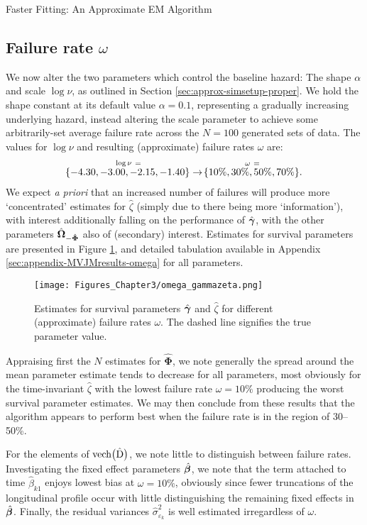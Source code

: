 \begin{chapter}{\label{cha:approx}Faster Fitting: An Approximate EM Algorithm}
  \subsection{Failure rate \texorpdfstring{$\omega$}{omega}}\label{sec:approx-sims-omega}
  We now alter the two parameters which control the baseline hazard: The shape $\alpha$ and scale $\log\nu$, as outlined in Section \ref{sec:approx-simsetup-proper}. We hold the shape constant at its default value $\alpha=0.1$, representing a gradually increasing underlying hazard, instead altering the scale parameter to achieve some arbitrarily-set average failure rate across the $N=100$ generated sets of data. The values for $\log\nu$ and resulting (approximate) failure rates $\omega$ are:
  \begin{align*}
      \overset{\log\nu\ =}{\!\left\{-4.30, -3.00, -2.15, -1.40\right\}}\rightarrow\overset{\omega\ =}{\!\left\{10\%,30\%,50\%,70\%\right\}}.
  \end{align*}
  We expect \textit{a priori} that an increased number of failures will produce more `concentrated' estimates for $\hat{\zeta}$ (simply due to there being more `information'), with interest additionally falling on the performance of $\hat{\bm{\gamma}}$, with the other parameters $\hat{\bm{\Omega}}_{-\hat{\bm{\Phi}}}$ also of (secondary) interest. Estimates for survival parameters are presented in Figure \ref{fig:approx-sims-omega}, and detailed tabulation available in Appendix \ref{sec:appendix-MVJMresults-omega} for all parameters.

  \begin{figure}[t]
      \centering
      \texttt{[image: Figures\_Chapter3/omega\_gammazeta.png]}
      \caption{Estimates for survival parameters $\hat{\bm{\gamma}}$ and $\hat{\zeta}$ for different (approximate) failure rates $\omega$. The dashed line signifies the true parameter value.}
      \label{fig:approx-sims-omega}
  \end{figure}

  Appraising first the $N$ estimates for $\hat{\bm{\Phi}}$, we note generally the spread around the mean parameter estimate tends to decrease for all parameters, most obviously for the time-invariant $\hat{\zeta}$ with the lowest failure rate $\omega=10\%$ producing the worst survival parameter estimates. We may then conclude from these results that the algorithm appears to perform best when the failure rate is in the region of 30--50\%. 
  
  For the elements of $\text{vech}\big(\hat{\mathrm{D}}\big)$, we note little to distinguish between failure rates. Investigating the fixed effect parameters $\hat{\bm{\beta}}$, we note that the term attached to time $\hat{\beta}_{k1}$ enjoys lowest bias at $\omega=10\%$, obviously since fewer truncations of the longitudinal profile occur with little distinguishing the remaining fixed effects in $\hat{\bm{\beta}}$. Finally, the residual variances $\hat{\sigma}^2_{\varepsilon_k}$ is well estimated irregardless of $\omega$.


\end{chapter}
